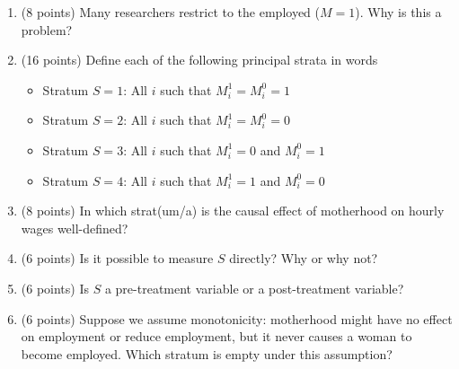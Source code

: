 \documentclass[10pt]{article}
\begin{document}
\begin{enumerate}
\item (8 points) Many researchers restrict to the employed ($M = 1$). Why is this a problem?
\item (16 points) Define each of the following principal strata in words
\begin{itemize}
\item Stratum $S = 1$: All $i$ such that $M_i^1 = M_i^0 = 1$
\item Stratum $S = 2$: All $i$ such that $M_i^1 = M_i^0 = 0$
\item Stratum $S = 3$: All $i$ such that $M_i^1 = 0$ and $M_i^0 = 1$
\item Stratum $S = 4$: All $i$ such that $M_i^1 = 1$ and $M_i^0 = 0$
\end{itemize}
\item (8 points) In which strat(um/a) is the causal effect of motherhood on hourly wages well-defined?
\item (6 points) Is it possible to measure $S$ directly? Why or why not?
\item (6 points) Is $S$ a pre-treatment variable or a post-treatment variable?
\item (6 points) Suppose we assume monotonicity: motherhood might have no effect on employment or reduce employment, but it never causes a woman to become employed. Which stratum is empty under this assumption?
\end{enumerate}
\end{document}
